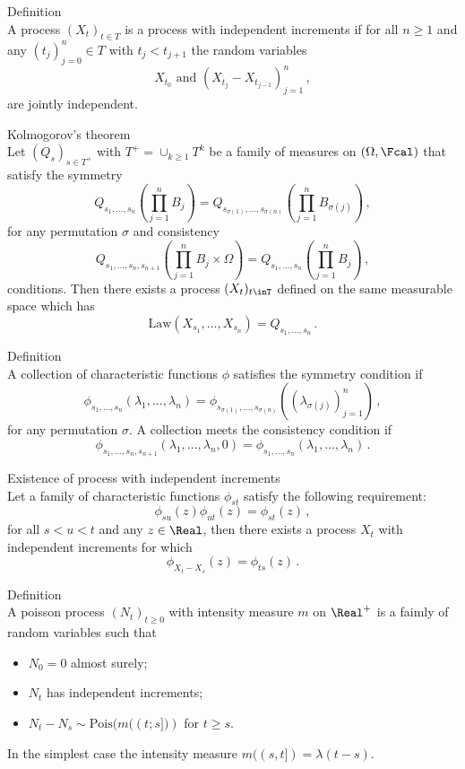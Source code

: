 \noindent Definition\hfill \\
A process $(X_t)_{t\in T}$ is a process with independent increments if for all 
$n\geq 1$ and any $(t_j)_{j=0}^n\in T$ with $t_j<t_{j+1}$ the random variables
\[ X_{t_0} \text{ and } (X_{t_j} - X_{t_{j-1}})_{j=1}^n \,,\]
are jointly independent.

\noindent Kolmogorov's theorem\hfill \\
Let $(Q_s)_{s\in T^+}$ with $T^+ = \cup_{k\geq 1} T^k$ be a family of measures
on $(\Omega, \Fcal)$ that satisfy the symmetry
\[ Q_{s_1,\ldots,s_n}( \prod_{j=1}^n B_j )
 = Q_{s_{\sigma(1)},\ldots,s_{\sigma(n)}}(\prod_{j=1}^n B_{\sigma(j)})
\,,\]
for any permutation $\sigma$ and consistency
\[ Q_{s_1,\ldots,s_n,s_{n+1}}( \prod_{j=1}^n B_j \times \Omega )
 = Q_{s_1,\ldots,s_n}( \prod_{j=1}^n B_j )\,,\]
conditions. Then there exists a process $(X_t)_{t\inT}$ defined on the same
measurable space which has
\[ \text{Law}( X_{s_1},\ldots,X_{s_n} ) = Q_{s_1,\ldots,s_n}\,. \]

\noindent Definition\hfill \\
A collection of characteristic functions $\phi$ satisfies the symmetry condition
if
\[ \phi_{s_1,\ldots,s_n}( \lambda_1, \ldots, \lambda_n )
 = \phi_{s_{\sigma(1)},\ldots,s_{\sigma(n)}}( (\lambda_{\sigma(j)})_{j=1}^n )
\,,\]
for any permutation $\sigma$. A collection meets the consistency condition if
\[ \phi_{s_1,\ldots,s_n,s_{n+1}}( \lambda_1, \ldots, \lambda_n, 0 )
 = \phi_{s_1,\ldots,s_n}( \lambda_1, \ldots, \lambda_n )\,.\]

\noindent Existence of process with independent increments\hfill \\
Let a family of characteristic functions $\phi_{st}$ satisfy the following 
requirement:
\[ \phi_{su}(z)\phi_{ut}(z) = \phi_{st}(z) \,, \]
for all $s<u<t$ and any $z\in \Real$, then there exists a process $X_t$ with
independent increments for which
\[ \phi_{X_t-X_s}(z) = \phi_{ts}(z)\,. \]

\noindent Definition\hfill \\
A poisson process $(N_t)_{t\geq 0}$ with intensity measure $m$ on $\Real^+$
is a faimly of random variables such that \begin{itemize}
	\item $N_0 = 0$ almost surely;
	\item $N_t$ has independent increments;
	\item $N_t-N_s \sim \text{Pois}(m\bigl((t;s]\bigr))$ for $t \geq s$.
\end{itemize}
In the simplest case the intensity measure $m((s,t]) = \lambda(t-s)$.

